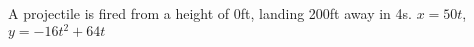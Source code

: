 {A projectile is fired from a height of 0ft, landing 200ft away in 4s.
}
{$x=50t$, $y=-16t^2 + 64t$
}